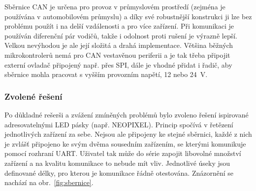         Sběrnice CAN je určena pro provoz v průmyslovém prostředí (zejména je používána v automobilovém průmyslu) a díky své robustnější konstrukci ji lze bez problému použít i na delší vzdálenosti a pro více zařízení. Při komunikaci je používán diferenční pár vodičů, takže i odolnost proti rušení je výrazně lepší. Velkou nevýhodou je ale její složitá a drahá implementace. Většina běžných mikrokontrolerů nemá pro CAN vestavěnou periferii a je tak třeba připojit externí ovladač připojený např. přes SPI, dále je vhodné přidat i řadič, aby sběrnice mohla pracovat s vyšším provozním napětí, 12 nebo \qty{24}{V}. 

    \subsubsection{Zvolené řešení}
        Po důkladné rešerši a zvážení zmíněných problémů bylo zvoleno řešení ispirované adresovatelnými LED pásky (např. NEOPIXEL). Princip spočívá v řetězení jednotlivých zařízení za sebe. Nejsou ale připojeny ke stejné sběrnici, každé z nich je zvlášť připojeno ke svým dvěma sousedním zařízením, se kterými komunikuje pomocí rozhraní UART. Uživatel tak může do série zapojit libovolné množství zařízení a na kvalitu komunikace to nebude mít vliv. Jednotlivé úseky jsou definované délky, pro kterou je komunikace řádně otestována. Znázornění se nachází na obr.~\ref{fig:sbernice}.

